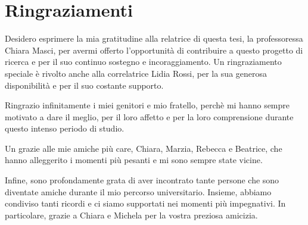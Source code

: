 \documentclass[11pt,a4paper]{article}
\begin{document}
\section*{Ringraziamenti}

Desidero esprimere la mia gratitudine alla relatrice di questa tesi, la professoressa Chiara Masci, per avermi offerto l'opportunità di contribuire a questo progetto di ricerca e per il suo continuo sostegno e incoraggiamento.
Un ringraziamento speciale è rivolto anche alla correlatrice Lidia Rossi, per la sua generosa disponibilità e per il suo costante supporto. \medskip

Ringrazio infinitamente i miei genitori e mio fratello, perchè mi hanno sempre motivato a dare il meglio, per il loro affetto e per la loro comprensione durante questo intenso periodo di studio. \medskip

Un grazie alle mie amiche più care, Chiara, Marzia, Rebecca e Beatrice, che hanno alleggerito i momenti più pesanti e mi sono sempre state vicine. \medskip

Infine, sono profondamente grata di aver incontrato tante persone che sono diventate amiche durante il mio percorso universitario. Insieme, abbiamo condiviso tanti ricordi e ci siamo supportati nei momenti più impegnativi. In particolare, grazie a Chiara e Michela per la vostra preziosa amicizia.


\end{document}
